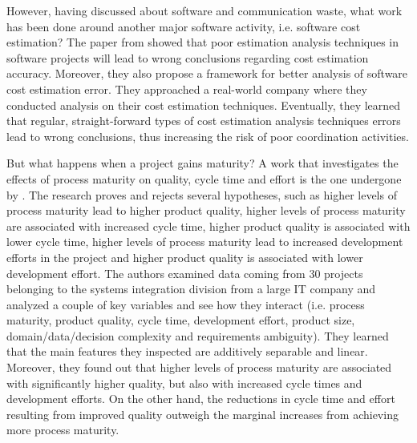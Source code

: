\documentclass{mprop}
\begin{document}
However, having discussed about software and communication waste, what work has been done
around another major software activity, i.e. software cost estimation? The paper from 
\citet{grimstad2006framework} showed that poor estimation analysis techniques
in software projects will lead to wrong conclusions regarding cost estimation accuracy.
Moreover, they also propose a framework for better analysis of software cost estimation
error. They approached a real-world company where they conducted analysis on their cost
estimation techniques. Eventually, they learned that regular, straight-forward types
of cost estimation analysis techniques errors lead to wrong conclusions, thus increasing
the risk of poor coordination activities.

But what happens when a project gains maturity? A work that investigates the effects of process
maturity on quality, cycle time and effort is the one undergone by \citet{harter2000effects}. The
research proves and rejects several hypotheses, such as higher levels of process maturity lead 
to higher product quality, higher levels of process maturity are associated with increased cycle time,
higher product quality is associated with lower cycle time, higher levels of process maturity lead 
to increased development efforts in the project and higher product quality is associated with lower
development effort. The authors examined data coming from 30 projects belonging to the systems 
integration division from a large IT company and analyzed a couple of key variables and see how
they interact (i.e. process maturity, product quality, cycle time, development effort, product
size, domain/data/decision complexity and requirements ambiguity). They learned that the main
features they inspected are additively separable and linear. Moreover, they found out that 
higher levels of process maturity are associated with significantly higher quality, but also
with increased cycle times and development efforts. On the other hand, the reductions in cycle
time and effort resulting from improved quality outweigh the marginal increases from achieving
more process maturity. 
\end{document}
